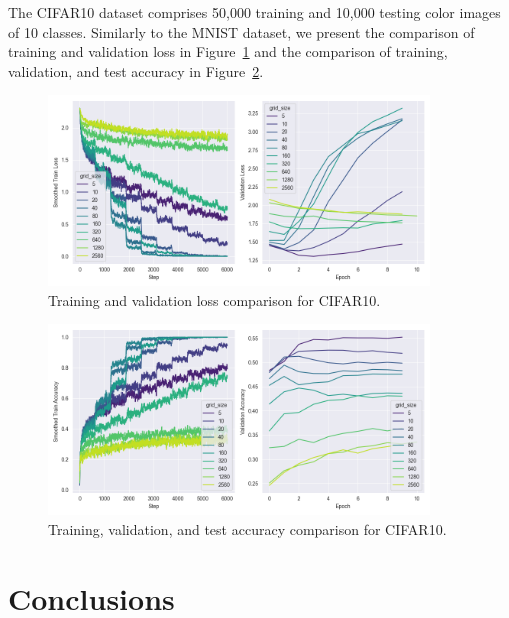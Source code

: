 \documentclass{article}
\begin{document}
The CIFAR10 dataset comprises 50,000 training and 10,000 testing color images of 10 classes.
Similarly to the MNIST dataset, we present the comparison of training and validation loss in Figure~\ref{fig:cifar10_loss}
and the comparison of training, validation, and test accuracy in Figure~\ref{fig:cifar10_accuracy}.

\begin{figure}[H]
    \centering
    \includegraphics[width=0.9\textwidth]{pics/cifar10_loss}
    \caption{Training and validation loss comparison for CIFAR10.}
    \label{fig:cifar10_loss}
\end{figure}

\begin{figure}[H]
    \centering
    \includegraphics[width=0.9\textwidth]{pics/cifar10_accuracy}
    \caption{Training, validation, and test accuracy comparison for CIFAR10.}
    \label{fig:cifar10_accuracy}
\end{figure}



\section{Conclusions}\label{sec:conclusions}


\clearpage %





\end{document}
